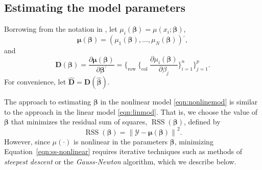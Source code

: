 \documentclass[cmfont,usenames,dvipsnames,leqno]{afit-etd}\usepackage[]{graphicx}\usepackage[]{color}
\newcommand{\norm}[1]{\left\|#1\right\|}
\newcommand{\trans}{\ensuremath{^\prime}}
\newcommand{\bc}[1]{\ensuremath{\bm{\mathcal{#1}}}}
\newcommand{\wh}[1]{\ensuremath{\widehat{#1}}}
\newcommand{\RSS}{\operatorname{RSS}}
\begin{document}
\subsection{Estimating the model parameters}
Borrowing from the notation in \citet{seber_nonlinear_2003}, let $\mu_i(\bm{\beta}) = \mu(x_i; \bm{\beta})$,
\begin{equation*}
  \bm{\mu}(\bm{\beta}) = \left( \mu_1(\bm{\beta}), \dotsc, \mu_N(\bm{\beta}) \right)\trans,
\end{equation*}
and
\begin{equation*}
  \bm{D}(\bm{\beta}) = \frac{\partial\bm{\mu}(\bm{\beta})}{\partial\bm{\beta}\trans} = \Bigg\lbrace_\text{row } \bigg\lbrace_\text{col } \frac{\partial \mu_i(\bm{\beta})}{\partial\beta_j} \bigg\rbrace_{i = 1}^n \Bigg\rbrace_{j = 1}^p.
\end{equation*}
For convenience, let $\widehat{\bm{D}} = \bm{D}(\wh{\bm{\beta}})$.

The approach to estimating $\bm{\beta}$ in the nonlinear model \eqref{eqn:nonlinemod} is similar to the approach in the linear model \eqref{eqn:linmod}. That is, we choose the value of $\bm{\beta}$ that minimizes the residual sum of squares, $\RSS(\bm{\beta})$, defined by
\begin{equation}
\label{eqn:ss-nonlinear}
  \RSS(\bm{\beta}) = \norm{\bc{Y} - \bm{\mu}(\bm{\beta})}^2.
\end{equation}
However, since $\mu(\cdot)$ is nonlinear in the parameters $\bm{\beta}$, minimizing Equation~\eqref{eqn:ss-nonlinear} requires iterative techniques such as methods of \textit{steepest descent} or the \textit{Gauss-Newton} algorithm, which we describe below. 
\end{document}
